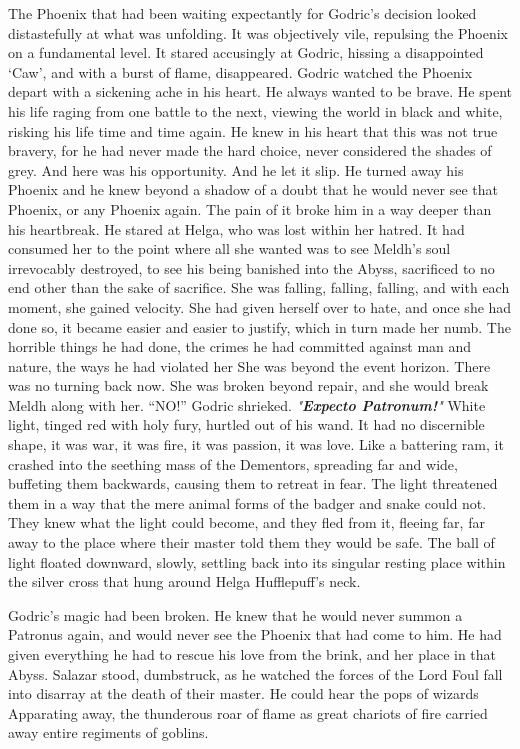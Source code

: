 \SmallVSpace
The Phoenix that had been waiting expectantly for Godric’s decision looked distastefully at what was unfolding. It was objectively vile, repulsing the Phoenix on a fundamental level. It stared accusingly at Godric, hissing a disappointed ‘Caw’, and with a burst of flame, disappeared.
\SmallVSpace
Godric watched the Phoenix depart with a sickening ache in his heart. He always wanted to be brave. He spent his life raging from one battle to the next, viewing the world in black and white, risking his life time and time again. He knew in his heart that this was not true bravery, for he had never made the hard choice, never considered the shades of grey.
\SmallVSpace
And here was his opportunity. And he let it slip. He turned away his Phoenix and he knew beyond a shadow of a doubt that he would never see that Phoenix, or any Phoenix again. The pain of it broke him in a way deeper than his heartbreak.
\SomeVSpace
He stared at Helga, who was lost within her hatred. It had consumed her to the point where all she wanted was to see Meldh’s soul irrevocably destroyed, to see his being banished into the Abyss, sacrificed to no end other than the sake of sacrifice. She was falling, falling, falling, and with each moment, she gained velocity. She had given herself over to hate, and once she had done so, it became easier and easier to justify, which in turn made her numb. The horrible things he had done, the crimes he had committed against man and nature, the ways he had violated her{\el}
\SmallVSpace
She was beyond the event horizon. There was no turning back now. She was broken beyond repair, and she would break Meldh along with her.
“NO!” Godric shrieked. \emph{"\textbf{Expecto Patronum!}"}
\SomeVSpace
White light, tinged red with holy fury, hurtled out of his wand. It had no discernible shape, it was war, it was fire, it was passion, it was love. Like a battering ram, it crashed into the seething mass of the Dementors, spreading far and wide, buffeting them backwards, causing them to retreat in fear. The light threatened them in a way that the mere animal forms of the badger and snake could not. They knew what the light could become, and they fled from it, fleeing far, far away to the place where their master told them they would be safe.
\SmallVSpace
The ball of light floated downward, slowly, settling back into its singular resting place within the silver cross that hung around Helga Hufflepuff’s neck.
\pagebreak

Godric’s magic had been broken. He knew that he would never summon a Patronus again, and would never see the Phoenix that had come to him. He had given everything he had to rescue his love from the brink, and her place in that Abyss.
\SomeVSpace
Salazar stood, dumbstruck, as he watched the forces of the Lord Foul fall into disarray at the death of their master. He could hear the pops of wizards Apparating away, the thunderous roar of flame as great chariots of fire carried away entire regiments of goblins.

